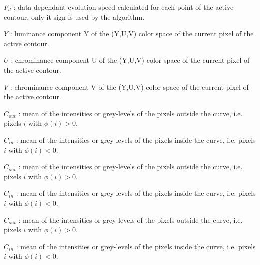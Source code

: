 \begin{DoxyItemize}
\item $F_{d}$ \-: data dependant evolution speed calculated for each point of the active contour, only it sign is used by the algorithm. \par

\item $Y$ \-: luminance component Y of the (Y,U,V) color space of the current pixel of the active contour. \par

\item $U$ \-: chrominance component U of the (Y,U,V) color space of the current pixel of the active contour. \par

\item $V$ \-: chrominance component V of the (Y,U,V) color space of the current pixel of the active contour. \par

\item $C_{out}$ \-: mean of the intensities or grey-\/levels of the pixels outside the curve, i.\-e. pixels $i$ with $\phi \left( i\right) >0$. \par

\item $C_{in}$ \-: mean of the intensities or grey-\/levels of the pixels inside the curve, i.\-e. pixels $i$ with $\phi \left( i\right) <0$. \par

\item $C_{out}$ \-: mean of the intensities or grey-\/levels of the pixels outside the curve, i.\-e. pixels $i$ with $\phi \left( i\right) >0$. \par

\item $C_{in}$ \-: mean of the intensities or grey-\/levels of the pixels inside the curve, i.\-e. pixels $i$ with $\phi \left( i\right) <0$. \par

\item $C_{out}$ \-: mean of the intensities or grey-\/levels of the pixels outside the curve, i.\-e. pixels $i$ with $\phi \left( i\right) >0$. \par

\item $C_{in}$ \-: mean of the intensities or grey-\/levels of the pixels inside the curve, i.\-e. pixels $i$ with $\phi \left( i\right) <0$. \par


\end{DoxyItemize}
